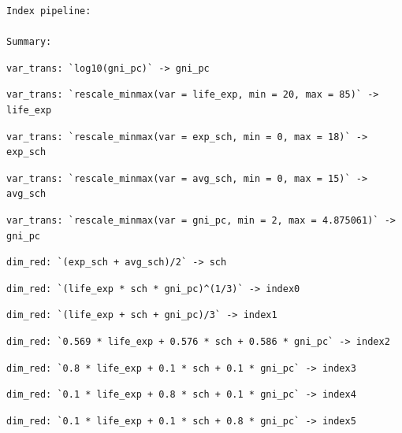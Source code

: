 \documentclass[
]{article}
\begin{document}
\begin{verbatim}
Index pipeline: 

Summary: 
\end{verbatim}

\begin{verbatim}
var_trans: `log10(gni_pc)` -> gni_pc
\end{verbatim}

\begin{verbatim}
var_trans: `rescale_minmax(var = life_exp, min = 20, max = 85)` -> life_exp
\end{verbatim}

\begin{verbatim}
var_trans: `rescale_minmax(var = exp_sch, min = 0, max = 18)` -> exp_sch
\end{verbatim}

\begin{verbatim}
var_trans: `rescale_minmax(var = avg_sch, min = 0, max = 15)` -> avg_sch
\end{verbatim}

\begin{verbatim}
var_trans: `rescale_minmax(var = gni_pc, min = 2, max = 4.875061)` -> gni_pc
\end{verbatim}

\begin{verbatim}
dim_red: `(exp_sch + avg_sch)/2` -> sch
\end{verbatim}

\begin{verbatim}
dim_red: `(life_exp * sch * gni_pc)^(1/3)` -> index0
\end{verbatim}

\begin{verbatim}
dim_red: `(life_exp + sch + gni_pc)/3` -> index1
\end{verbatim}

\begin{verbatim}
dim_red: `0.569 * life_exp + 0.576 * sch + 0.586 * gni_pc` -> index2
\end{verbatim}

\begin{verbatim}
dim_red: `0.8 * life_exp + 0.1 * sch + 0.1 * gni_pc` -> index3
\end{verbatim}

\begin{verbatim}
dim_red: `0.1 * life_exp + 0.8 * sch + 0.1 * gni_pc` -> index4
\end{verbatim}

\begin{verbatim}
dim_red: `0.1 * life_exp + 0.1 * sch + 0.8 * gni_pc` -> index5
\end{verbatim}
\end{document}
